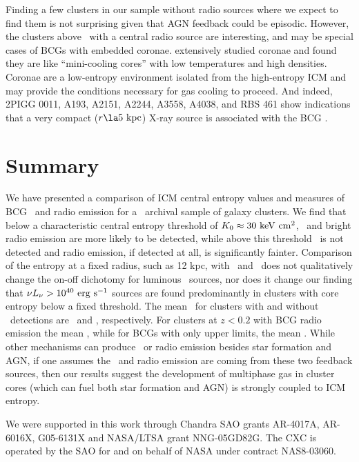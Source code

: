 \documentclass[12pt,preprint]{aastex}
\begin{document}
Finding a few clusters in our sample without radio sources where we
expect to find them is not surprising given that AGN feedback could be
episodic. However, the clusters above \kthr\ with a central radio
source are interesting, and may be special cases of BCGs with embedded
coronae. \cite{coronae} extensively studied coronae and found they are
like ``mini-cooling cores'' with low temperatures and high
densities. Coronae are a low-entropy environment isolated from the
high-entropy ICM and may provide the conditions necessary for gas
cooling to proceed. And indeed, 2PIGG 0011, A193, A2151, A2244, A3558,
A4038, and RBS 461 show indications that a very compact ($r \la
5\kpc$) X-ray source is associated with the BCG \citep{accept}.

\section{Summary}
\label{sec:diss}

We have presented a comparison of ICM central entropy values and
measures of BCG \halpha\ and radio emission for a \Chandra\ archival
sample of galaxy clusters. We find that below a characteristic central
entropy threshold of $K_0 \approx 30 \mathrm{\mbox{\ensuremath{\mathrm{~keV}}} \mathrm{\mbox{\ensuremath{\mathrm{~cm}}}^2}}$, \halpha\ and bright radio
emission are more likely to be detected, while above this threshold
\halpha\ is not detected and radio emission, if detected at all, is
significantly fainter. Comparison of the entropy at a fixed radius,
such as 12 kpc, with \lha\ and \radpow\ does not qualitatively change
the on-off dichotomy for luminous \halpha\ sources, nor does it change
our finding that $\nu L_{\nu} > 10^{40} \mathrm{\mbox{\ensuremath{\mathrm{~erg}}} \mathrm{\mbox{\ensuremath{\mathrm{~s}}}^{-1}}}$ sources are found
predominantly in clusters with core entropy below a fixed
threshold. The mean \kna\ for clusters with and without
\halpha\ detections are \fha\ and \nfha, respectively. For clusters at
$z < 0.2$ with BCG radio emission the mean \frad, while for BCGs with
only upper limits, the mean \nfrad. While other mechanisms can produce
\halpha\ or radio emission besides star formation and AGN, if one
assumes the \halpha\ and radio emission are coming from these two
feedback sources, then our results suggest the development of
multiphase gas in cluster cores (which can fuel both star formation
and AGN) is strongly coupled to ICM entropy.

\acknowledgements
We were supported in this work through Chandra SAO grants AR-4017A,
AR-6016X, G05-6131X and NASA/LTSA grant NNG-05GD82G. The CXC is
operated by the SAO for and on behalf of NASA under contract
NAS8-03060.
\end{document}
